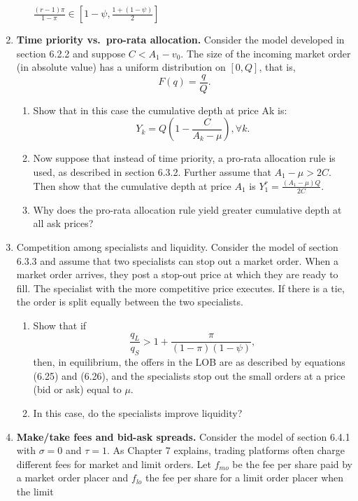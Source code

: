 \documentclass[a4paper]{article}
\begin{document}
\begin{enumerate}
\begin{enumerate}
        $\frac{(r-1)\pi}{1-\pi} \in \left[1-\psi, \frac{1+(1-\psi)}{2}\right]$
      \end{enumerate}
    \item \textbf{Time priority vs.\ pro-rata allocation.} Consider the model developed in
      section 6.2.2 and suppose $C<A_1 - v_0$. The size of the incoming market order (in absolute value) has a uniform 
      distribution on $[0, Q]$, that is,
      \[F(q) = \frac{q}{Q}.\]
      \begin{enumerate}
        \item Show that in this case the cumulative depth at price Ak is:
          \[Y_k = Q\left(1-\frac{C}{A_k - \mu}\right), \forall k.\]
        \item Now suppose that instead of time priority, a pro-rata allocation rule is used, as described in section 6.3.2. 
          Further assume that $A_1 - \mu > 2C$. Then show that the cumulative depth at price $A_1$ is $Y_1^r = \frac{(A_1 - \mu)Q}{2C}$.
        \item Why does the pro-rata allocation rule yield greater cumulative depth at all ask prices?
      \end{enumerate}
    \item Competition among specialists and liquidity. Consider the model of section 
      6.3.3 and assume that two specialists can stop out a market order. When a market 
      order arrives, they post a stop-out price at which they are ready to fill. The specialist
      with the more competitive price executes. If there is a tie, the order is split equally
      between the two specialists.
      \begin{enumerate}
        \item Show that if
          \[\frac{q_L}{q_S} > 1 + \frac{\pi}{(1-\pi)(1-\psi)},\]
          then, in equilibrium, the offers in the LOB are as described by equations (6.25) and (6.26), and the 
          specialists stop out the small orders at a price (bid or ask) equal to $\mu$.
        \item In this case, do the specialists improve liquidity?
      \end{enumerate}
    \item  \textbf{Make/take fees and bid-ask spreads.} Consider the model of section 6.4.1
      with $\sigma= 0$ and $\tau = 1$. As Chapter 7 explains, trading platforms often charge
      different fees for market and limit orders. Let $f_{mo}$ be the fee per share paid by a
      market order placer and $f_{lo}$ the fee per share for a limit order placer when the limit

\end{enumerate}
\end{document}
